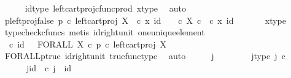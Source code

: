 \begin{isabellebody}
\ \ \ \ \isamarkupfalse%
\ id{\isacharunderscore}{\kern0pt}type\ left{\isacharunderscore}{\kern0pt}cart{\isacharunderscore}{\kern0pt}proj{\isacharunderscore}{\kern0pt}cfunc{\isacharunderscore}{\kern0pt}prod\ x{\isacharunderscore}{\kern0pt}type\ \isamarkupfalse%
\ auto\isanewline
\ \ \isamarkupfalse%
\ \isamarkupfalse%
\ p{\isacharunderscore}{\kern0pt}left{\isacharunderscore}{\kern0pt}proj{\isacharunderscore}{\kern0pt}false{\isacharcolon}{\kern0pt}\ {\isachardoublequoteopen}p\ {\isasymcirc}\isactrlsub c\ left{\isacharunderscore}{\kern0pt}cart{\isacharunderscore}{\kern0pt}proj\ X\ {\isasymone}\ {\isasymcirc}\isactrlsub c\ {\isasymlangle}x{\isacharcomma}{\kern0pt}\ id\ {\isasymone}{\isasymrangle}\ {\isacharequal}{\kern0pt}\ {\isasymf}\ {\isasymcirc}\isactrlsub c\ {\isasymbeta}\isactrlbsub X\ {\isasymtimes}\isactrlsub c\ {\isasymone}\isactrlesub \ {\isasymcirc}\isactrlsub c\ {\isasymlangle}x{\isacharcomma}{\kern0pt}\ id\ {\isasymone}{\isasymrangle}{\isachardoublequoteclose}\isanewline
\ \ \ \ \isamarkupfalse%
\ x{\isacharunderscore}{\kern0pt}type\ \isamarkupfalse%
\ {\isacharparenleft}{\kern0pt}typecheck{\isacharunderscore}{\kern0pt}cfuncs{\isacharcomma}{\kern0pt}\ metis\ id{\isacharunderscore}{\kern0pt}right{\isacharunderscore}{\kern0pt}unit{}\ one{\isacharunderscore}{\kern0pt}unique{\isacharunderscore}{\kern0pt}element{\isacharparenright}{\kern0pt}\isanewline
\isanewline
\ \ \isamarkupfalse%
\ {\isachardoublequoteopen}{\isasymt}\ {\isasymcirc}\isactrlsub c\ id\ {\isasymone}\ {\isacharequal}{\kern0pt}\ FORALL\ X\ {\isasymcirc}\isactrlsub c\ {\isacharparenleft}{\kern0pt}p\ {\isasymcirc}\isactrlsub c\ left{\isacharunderscore}{\kern0pt}cart{\isacharunderscore}{\kern0pt}proj\ X\ {\isasymone}{\isacharparenright}{\kern0pt}\isactrlsup {\isasymsharp}{\isachardoublequoteclose}\isanewline
\ \ \ \ \isamarkupfalse%
\ FORALL{\isacharunderscore}{\kern0pt}p{\isacharunderscore}{\kern0pt}true\ id{\isacharunderscore}{\kern0pt}right{\isacharunderscore}{\kern0pt}unit{}\ true{\isacharunderscore}{\kern0pt}func{\isacharunderscore}{\kern0pt}type\ \isamarkupfalse%
\ auto\isanewline
\ \ \isamarkupfalse%
\ \isamarkupfalse%
\ j\ \ \isanewline
\ \ \ \ \ \ j{\isacharunderscore}{\kern0pt}type{\isacharcolon}{\kern0pt}\ {\isachardoublequoteopen}j\ {\isasymin}\isactrlsub c\ {\isasymone}{\isachardoublequoteclose}\ \ \isanewline
\ \ \ \ \ \ j{\isacharunderscore}{\kern0pt}id{\isacharcolon}{\kern0pt}\ {\isachardoublequoteopen}{\isasymbeta}\isactrlbsub {\isasymone}\isactrlesub \ {\isasymcirc}\isactrlsub c\ j\ {\isacharequal}{\kern0pt}\ id\ {\isasymone}{\isachardoublequoteclose}\ \isanewline

\end{isabellebody}
